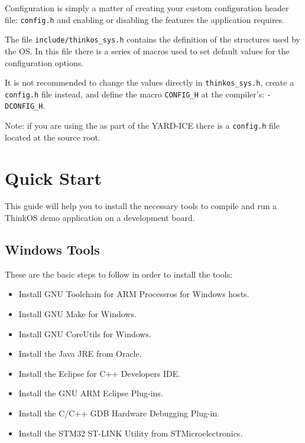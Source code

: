 Configuration is simply a matter of creating your custom configuration header file: \lstinline{config.h} and enabling or disabling the features the application requires.

The file \lstinline{include/thinkos_sys.h} contains the definition of the structures used by the OS. In this file there is a series of macros used to set default values for the configuration options.

It is not recommended to change the values directly in \lstinline{thinkos_sys.h}, create a \lstinline{config.h} file instead, and define the macro \lstinline{CONFIG_H} at the compiler's: \lstinline{-DCONFIG_H}.

Note: if you are using the \ThinkOS as part of the YARD-ICE there is a \lstinline{config.h} file located at the source root.



\section {Quick Start}

This guide will help you to install the necessary tools to compile and run a ThinkOS demo application on a development board.

\subsection{Windows Tools}

These are the basic steps to follow in order to install the tools: 

\begin{itemize}
\item Install GNU Toolchain for ARM Processros for Windows hosts.
\item Install GNU Make for Windows.
\item Install GNU CoreUtils for Windows.
\item Install the Java JRE from Oracle.
\item Install the Eclipse for C++ Developers IDE.
\item Install the GNU ARM Eclipse Plug-ins.
\item Install the C/C++ GDB Hardware Debugging Plug-in.
\item Install the STM32 ST-LINK Utility from STMicroelectronics.
\end{itemize}


